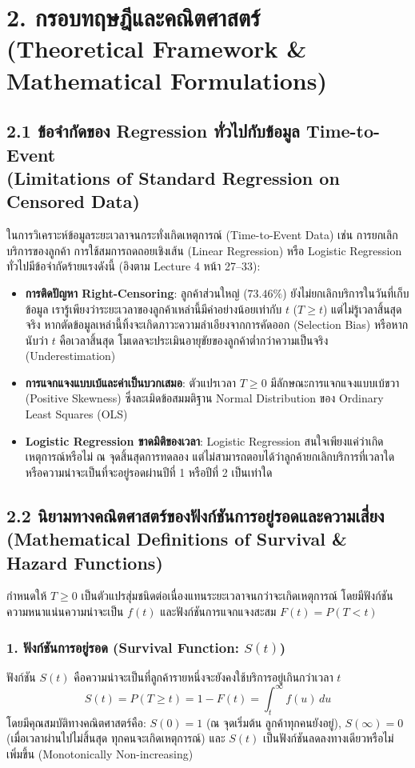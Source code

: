 \documentclass[12pt,a4paper]{article}
\begin{document}
\section*{2. กรอบทฤษฎีและคณิตศาสตร์\\ \large(Theoretical Framework \& Mathematical Formulations)}

\subsection*{2.1 ข้อจำกัดของ Regression ทั่วไปกับข้อมูล Time-to-Event\\ \normalsize(Limitations of Standard Regression on Censored Data)}
ในการวิเคราะห์ข้อมูลระยะเวลาจนกระทั่งเกิดเหตุการณ์ (Time-to-Event Data) เช่น การยกเลิกบริการของลูกค้า การใช้สมการถดถอยเชิงเส้น (Linear Regression) หรือ Logistic Regression ทั่วไปมีข้อจำกัดร้ายแรงดังนี้ (อิงตาม Lecture 4 หน้า 27--33):
\begin{itemize}[leftmargin=18pt, itemsep=2pt]
    \item \textbf{การติดปัญหา Right-Censoring}: ลูกค้าส่วนใหญ่ ($73.46\%$) ยังไม่ยกเลิกบริการในวันที่เก็บข้อมูล เรารู้เพียงว่าระยะเวลาของลูกค้าเหล่านี้มีค่าอย่างน้อยเท่ากับ $t$ ($T \ge t$) แต่ไม่รู้เวลาสิ้นสุดจริง หากตัดข้อมูลเหล่านี้ทิ้งจะเกิดภาวะความลำเอียงจากการคัดออก (Selection Bias) หรือหากนับว่า $t$ คือเวลาสิ้นสุด โมเดลจะประเมินอายุขัยของลูกค้าต่ำกว่าความเป็นจริง (Underestimation)
    \item \textbf{การแจกแจงแบบเบ้และค่าเป็นบวกเสมอ}: ตัวแปรเวลา $T \ge 0$ มีลักษณะการแจกแจงแบบเบ้ขวา (Positive Skewness) ซึ่งละเมิดข้อสมมติฐาน Normal Distribution ของ Ordinary Least Squares (OLS)
    \item \textbf{Logistic Regression ขาดมิติของเวลา}: Logistic Regression สนใจเพียงแค่ว่าเกิดเหตุการณ์หรือไม่ ณ จุดสิ้นสุดการทดลอง แต่ไม่สามารถตอบได้ว่าลูกค้ายกเลิกบริการที่เวลาใด หรือความน่าจะเป็นที่จะอยู่รอดผ่านปีที่ 1 หรือปีที่ 2 เป็นเท่าใด
\end{itemize}

\subsection*{2.2 นิยามทางคณิตศาสตร์ของฟังก์ชันการอยู่รอดและความเสี่ยง\\ \normalsize(Mathematical Definitions of Survival \& Hazard Functions)}
กำหนดให้ $T \ge 0$ เป็นตัวแปรสุ่มชนิดต่อเนื่องแทนระยะเวลาจนกว่าจะเกิดเหตุการณ์ โดยมีฟังก์ชันความหนาแน่นความน่าจะเป็น $f(t)$ และฟังก์ชันการแจกแจงสะสม $F(t) = P(T < t)$

\subsubsection*{1. ฟังก์ชันการอยู่รอด (Survival Function: $S(t)$)}
ฟังก์ชัน $S(t)$ คือความน่าจะเป็นที่ลูกค้ารายหนึ่งจะยังคงใช้บริการอยู่เกินกว่าเวลา $t$
\begin{equation}
    S(t) = P(T \ge t) = 1 - F(t) = \int_t^\infty f(u)\,du
\end{equation}
โดยมีคุณสมบัติทางคณิตศาสตร์คือ: $S(0) = 1$ (ณ จุดเริ่มต้น ลูกค้าทุกคนยังอยู่), $S(\infty) = 0$ (เมื่อเวลาผ่านไปไม่สิ้นสุด ทุกคนจะเกิดเหตุการณ์) และ $S(t)$ เป็นฟังก์ชันลดลงทางเดียวหรือไม่เพิ่มขึ้น (Monotonically Non-increasing)
\end{document}
